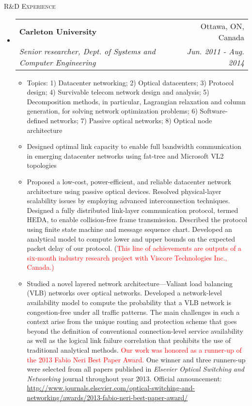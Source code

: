 \documentclass[letterpaper,11pt]{article}
\makeatletter
\newcommand{\resheading}[1]{{\noindent\large \colorbox{mygrey}{
\begin{minipage}{1.0\textwidth}{\textsc{#1 \vphantom{p\^{E}}}}\end{minipage}}}}
\newcommand{\ressubheading}[4]{
\begin{tabular*}{6.69in}{l@{\extracolsep{\fill}}r}
        \textbf{#1} & #2 \\
        \textit{#3} & \textit{#4} \\
\end{tabular*}\vspace{-6pt}
}
\newcommand{\resitem}[1]{\item #1 \vspace{-2pt}}
\makeatother
\begin{document}
\begin{CJK}{UTF8}{gbsn}
\begin{itemize}
\end{itemize}



\resheading{R\&D Experience}%

\begin{itemize}%
\setlength{\itemindent}{-0.075in}

\item
    \ressubheading{Carleton University}{Ottawa, ON, Canada} %
    {Senior researcher, Dept. of Systems and Computer Engineering}{Jun. 2011 - Aug. 2014} %
    \begin{itemize}
        \resitem{Topics: 1) Datacenter networking; 2) Optical datacenters; 3) Protocol design; 4) Survivable telecom network design and analysis;
        5) Decomposition methods, in particular, Lagrangian relaxation and column generation, for solving network optimization problems; 6) Software-defined networks;
        7) Passive optical networks; 8) Optical node architecture}
        \resitem{Designed optimal link capacity to enable full bandwidth communication in emerging datacenter networks using fat-tree and Microsoft VL2 topologies}
        \resitem{Proposed a low-cost, power-efficient, and reliable datacenter network architecture using passive optical devices.
        Resolved physical-layer scalability issues by employing advanced interconnection techniques.
        Designed a fully distributed link-layer communication protocol, termed HEDA, to enable collision-free frame transmission.
        Described the protocol using finite state machine and message sequence chart.
        Developed an analytical model to compute lower and upper bounds on the expected packet delay of our protocol.
        (\textcolor{Red}{This line of achievements are outputs of a six-month industry research project with Viscore Technologies Inc., Canada.)}}
        \resitem{Studied a novel layered network architecture---Valiant load balancing (VLB) networks over optical networks.
        Developed a network-level availability model to compute the probability that a VLB network is congestion-free under all traffic patterns.
        The main challenges in such a context arise from the unique routing and protection scheme that goes beyond the definition of conventional connection-level service availability
        as well as the logical link failure correlation that prohibits the use of traditional analytical methods.
        \textcolor{Red}{Our work was honored as a runner-up of the 2013 Fabio Neri Best Paper Award.}
        One winner and three runners-up were selected from all papers published in \textit{Elsevier Optical Switching and Networking} journal throughout year 2013.
        Official announcement: \url{http://www.journals.elsevier.com/optical-switching-and-networking/awards/2013-fabio-neri-best-paper-award/}}


\end{itemize}
\end{itemize}
\end{CJK}
\end{document}
